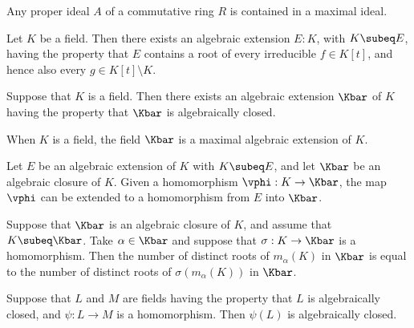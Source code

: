 \documentclass{article}
\begin{document}
  \begin{tproposition}
    Any proper ideal \( A \) of a commutative ring \( R \) is contained in a maximal ideal.
  \end{tproposition}

  \begin{tlemma}
    Let \( K \) be a field.
    Then there exists an algebraic extension \( E:K \), with \( K\subeq E \), having the property that \( E \) contains a root of every irreducible \( f\in K[t] \), and hence also every \( g\in K[t]\setminus K \).
  \end{tlemma}

  \begin{ttheorem}
    Suppose that \( K \) is a field.
    Then there exists an algebraic extension \( \Kbar \) of \( K \) having the property that \( \Kbar \) is algebraically closed.
  \end{ttheorem}

  \begin{tcorollary}
    When \( K \) is a field, the field \( \Kbar \) is a maximal algebraic extension of \( K \).
  \end{tcorollary}

  \begin{ttheorem}
    Let \( E \) be an algebraic extension of \( K \) with \( K\subeq E \), and let \( \Kbar \) be an algebraic closure of \( K \).
    Given a homomorphism \( \vphi:K\to \Kbar \), the map \( \vphi \) can be extended to a homomorphism from \( E \) into \( \Kbar \).
  \end{ttheorem}

  \begin{tcorollary}
    Suppose that \( \Kbar \) is an algebraic closure of \( K \), and assume that \( K\subeq \Kbar \).
    Take \( \alpha\in \Kbar \) and suppose that \( \sigma:K\to \Kbar \) is a homomorphism.
    Then the number of distinct roots of \( m_\alpha(K) \) in \( \Kbar \) is equal to the number of distinct roots of \( \sigma(m_\alpha(K)) \) in \( \Kbar \).
  \end{tcorollary}

  \begin{tproposition}
    Suppose that \( L \) and \( M \) are fields having the property that \( L \) is algebraically closed, and \( \psi : L \to M \) is a homomorphism.
    Then \( \psi(L) \) is algebraically closed.
  \end{tproposition}
\end{document}
